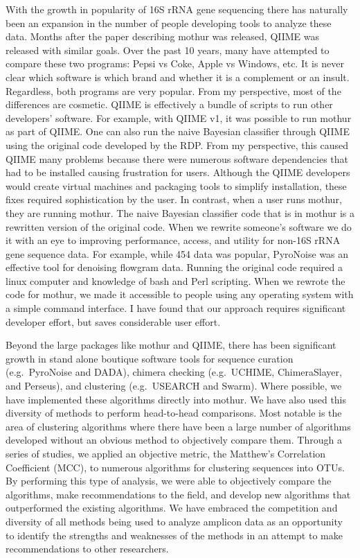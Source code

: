 \documentclass[11pt,]{article}
\begin{document}
With the growth in popularity of 16S rRNA gene sequencing there has
naturally been an expansion in the number of people developing tools to
analyze these data. Months after the paper describing mothur was
released, QIIME was released with similar goals. Over the past 10 years,
many have attempted to compare these two programs: Pepsi vs Coke, Apple
vs Windows, etc. It is never clear which software is which brand and
whether it is a complement or an insult. Regardless, both programs are
very popular. From my perspective, most of the differences are cosmetic.
QIIME is effectively a bundle of scripts to run other developers'
software. For example, with QIIME v1, it was possible to run mothur as
part of QIIME. One can also run the naive Bayesian classifier through
QIIME using the original code developed by the RDP. From my perspective,
this caused QIIME many problems because there were numerous software
dependencies that had to be installed causing frustration for users.
Although the QIIME developers would create virtual machines and
packaging tools to simplify installation, these fixes required
sophistication by the user. In contrast, when a user runs mothur, they
are running mothur. The naive Bayesian classifier code that is in mothur
is a rewritten version of the original code. When we rewrite someone's
software we do it with an eye to improving performance, access, and
utility for non-16S rRNA gene sequence data. For example, while 454 data
was popular, PyroNoise was an effective tool for denoising flowgram
data. Running the original code required a linux computer and knowledge
of bash and Perl scripting. When we rewrote the code for mothur, we made
it accessible to people using any operating system with a simple command
interface. I have found that our approach requires significant developer
effort, but saves considerable user effort.

Beyond the large packages like mothur and QIIME, there has been
significant growth in stand alone boutique software tools for sequence
curation (e.g.~PyroNoise and DADA), chimera checking (e.g.~UCHIME,
ChimeraSlayer, and Perseus), and clustering (e.g.~USEARCH and Swarm).
Where possible, we have implemented these algorithms directly into
mothur. We have also used this diversity of methods to perform
head-to-head comparisons. Most notable is the area of clustering
algorithms where there have been a large number of algorithms developed
without an obvious method to objectively compare them. Through a series
of studies, we applied an objective metric, the Matthew's Correlation
Coefficient (MCC), to numerous algorithms for clustering sequences into
OTUs. By performing this type of analysis, we were able to objectively
compare the algorithms, make recommendations to the field, and develop
new algorithms that outperformed the existing algorithms. We have
embraced the competition and diversity of all methods being used to
analyze amplicon data as an opportunity to identify the strengths and
weaknesses of the methods in an attempt to make recommendations to other
researchers.
\end{document}
